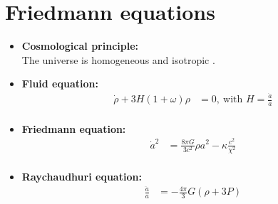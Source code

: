\documentclass[8pt,hideothersubsections]{beamer}
\begin{document}
\section{Friedmann equations}
\begin{frame}
\begin{itemize}
\frametitle{\insertsectionhead}

\item \textbf{Cosmological principle:}\\
The universe is homogeneous and isotropic \citep{ITC}.

\item \textbf{Fluid equation:}
\begin{equation}\label{eq:6}
\begin{split}
\dot{\rho}+3H\left(1+\omega\right)\rho &= 0,\ \text{with } H=\frac{\dot{a}}{a}\\
\end{split}
\end{equation}
\item \textbf{Friedmann equation:}
\begin{equation}
\begin{split}\label{eq:CurvFriedman}
\dot{a}^{2} &= \frac{8\pi G}{3c^{2}}\rho a^{2}-\kappa\frac{c^{2}}{\chi^{2}}\\
\end{split}
\end{equation}
\item \textbf{Raychaudhuri equation:}
\begin{equation}\label{eq:RayEq}
\begin{split}
\frac{\ddot{a}}{a} &= -\frac{4\pi}{3}G\left(\rho +3P\right)\\
\end{split}
\end{equation}

\end{itemize}
\end{frame}
\end{document}
